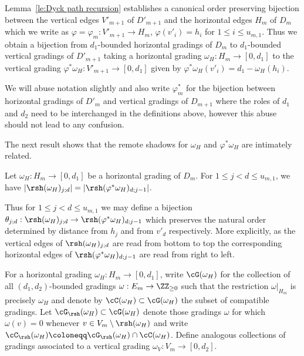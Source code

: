 Lemma~\ref{le:Dyck path recursion} establishes a canonical order preserving bijection between the vertical edges $V'_{m+1}$ of $D'_{m+1}$ and the horizontal edges $H_m$ of $D_m$ which we write as $\varphi=\varphi_m:V'_{m+1}\to H_m$, $\varphi(v'_i)=h_i$ for $1\le i\le u_{m,1}$. 
Thus we obtain a bijection from $d_1$-bounded horizontal gradings of $D_m$ to $d_1$-bounded vertical gradings of $D'_{m+1}$ taking a horizontal grading $\omega_H:H_m\to[0,d_1]$ to the vertical grading $\varphi^*\omega_H:V'_{m+1}\to[0,d_1]$ given by $\varphi^*\omega_H(v'_i)=d_1-\omega_H(h_i)$.
\begin{remark}
 We will abuse notation slightly and also write $\varphi^*_m$ for the bijection between horizontal gradings of $D'_m$ and vertical gradings of $D_{m+1}$ where the roles of $d_1$ and $d_2$ need to be interchanged in the definitions above, however this abuse should not lead to any confusion.
\end{remark}

The next result shows that the remote shadows for $\omega_H$ and $\varphi^*\omega_H$ are intimately related.
\begin{lemma}
 \label{le:remote shadow cardinalities}
 Let $\omega_H:H_m\to[0,d_1]$ be a horizontal grading of $D_m$.
 For $1\le j<d\le u_{m,1}$, we have $|\rsh(\omega_H)_{j;d}|=|\rsh(\varphi^*\omega_H)_{d;j-1}|$.
\end{lemma}

Thus for $1\le j<d\le u_{m,1}$ we may define a bijection $\theta_{j;d}:\rsh(\omega_H)_{j;d}\to\rsh(\varphi^*\omega_H)_{d;j-1}$ which preserves the natural order determined by distance from $h_j$ and from $v'_d$ respectively. More explicitly, as the vertical edges of $\rsh(\omega_H)_{j;d}$ are read from bottom to top the corresponding horizontal edges of $\rsh(\varphi^*\omega_H)_{d;j-1}$ are read from right to left.

For a horizontal grading $\omega_H:H_m\to[0,d_1]$, write $\cG(\omega_H)$ for the collection of all $(d_1,d_2)$-bounded gradings $\omega:E_m\to\ZZ_{\ge0}$ such that the restriction $\omega|_{H_m}$ is precisely $\omega_H$ and denote by $\cC(\omega_H)\subset\cG(\omega_H)$ the subset of compatible gradings.
Let $\cG_{\rsh}(\omega_H)\subset\cG(\omega_H)$ denote those gradings $\omega$ for which $\omega(v)=0$ whenever $v\in V_m\setminus\rsh(\omega_H)$ and write $\cC_{\rsh}(\omega_H)\coloneqq \cG_{\rsh}(\omega_H)\cap\cC(\omega_H)$.
Define analogous collections of gradings associated to a vertical grading $\omega_V:V_m\to[0,d_2]$.

